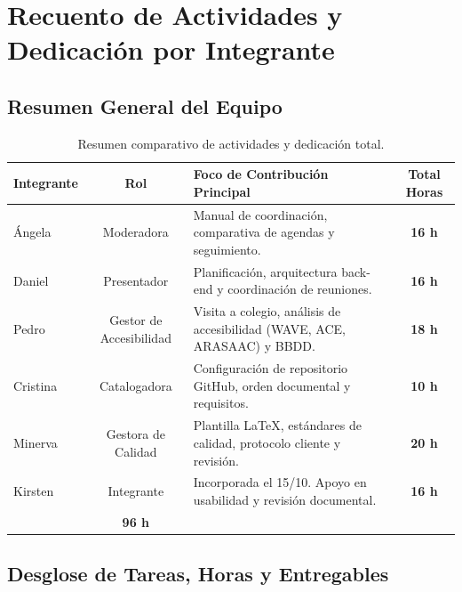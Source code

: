 \section{Recuento de Actividades y Dedicación por Integrante}

\subsection{Resumen General del Equipo}

\begin{table}[H]
\centering
\small
{}
\begin{tabularx}{\textwidth}{X c X c}
\toprule
\rowcolor{azulPastelApagado}
\textbf{\color{textoOscuro}Integrante} & \textbf{\color{textoOscuro}Rol} & \textbf{\color{textoOscuro}Foco de Contribución Principal} & \textbf{\color{textoOscuro}Total Horas} \\
\midrule
Ángela   & Moderadora & Manual de coordinación, comparativa de agendas y seguimiento. & \textbf{16 h} \\
Daniel   & Presentador & Planificación, arquitectura back-end y coordinación de reuniones. & \textbf{16 h} \\
Pedro    & Gestor de Accesibilidad & Visita a colegio, análisis de accesibilidad (WAVE, ACE, ARASAAC) y BBDD. & \textbf{18 h} \\
Cristina & Catalogadora & Configuración de repositorio GitHub, orden documental y requisitos. & \textbf{10 h} \\
Minerva  & Gestora de Calidad & Plantilla \LaTeX, estándares de calidad, protocolo cliente y revisión. & \textbf{20 h} \\
Kirsten  & Integrante & Incorporada el 15/10. Apoyo en usabilidad y revisión documental. & \textbf{16 h} \\
\midrule
\rowcolor{azulclaro!60}
\multicolumn{3}{l}{\textbf{\color{textoOscuro}Total Horas Invertidas por el Equipo:}} & \textbf{\color{textoOscuro}96 h} \\
\bottomrule
\end{tabularx}
\caption{Resumen comparativo de actividades y dedicación total.}
\label{tab:resumen-general-dgp}
\end{table}

\newpage
\subsection{Desglose de Tareas, Horas y Entregables}

